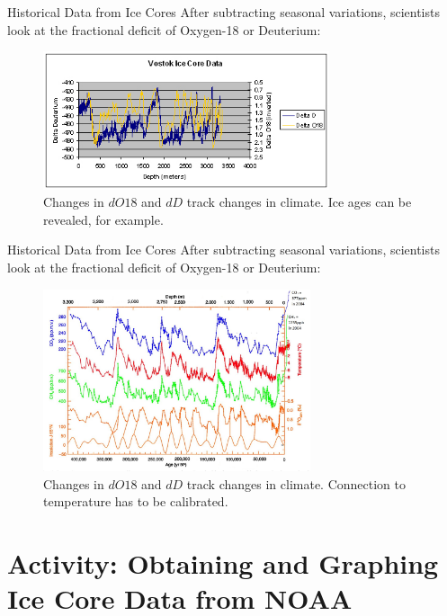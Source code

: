 \documentclass{beamer}
\begin{document}
\begin{frame}{Historical Data from Ice Cores}
After subtracting seasonal variations, scientists look at the fractional deficit of Oxygen-18 or Deuterium:
\begin{figure}
\centering
\includegraphics[width=0.75\textwidth]{Vostok_deltaD_deltaO18.jpg}
\caption{\label{fig:vostok} Changes in $dO18$ and $dD$ track changes in climate.  Ice ages can be revealed, for example.}
\end{figure}
\end{frame}

\begin{frame}{Historical Data from Ice Cores}
After subtracting seasonal variations, scientists look at the fractional deficit of Oxygen-18 or Deuterium:
\begin{figure}
\centering
\includegraphics[width=0.7\textwidth]{Vostok2.jpg}
\caption{\label{fig:vostok} Changes in $dO18$ and $dD$ track changes in climate.  Connection to temperature has to be calibrated.}
\end{figure}
\end{frame}

\section{Activity: Obtaining and Graphing Ice Core Data from NOAA}
\end{document}

